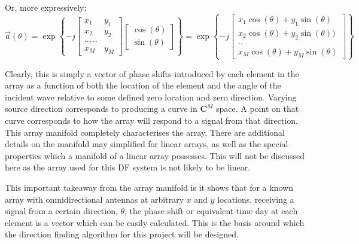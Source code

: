 Or, more expressively:
\begin{equation}
\vec{a}(\theta) = \exp \left\{ -j \begin{bmatrix} x_1 & y_1 \\ x_2 & y_2 \\ .., .. \\ x_M & y_M \end{bmatrix} \begin{bmatrix} \cos(\theta) \\ \sin(\theta) \end{bmatrix} \right\}
= \exp \left\{ -j \begin{bmatrix} x_1\cos(\theta) + y_1\sin(\theta) \\ x_2\cos(\theta) + y_2\sin(\theta)) \\ .. \\ x_M\cos(\theta) + y_M\sin(\theta) \end{bmatrix} \right\}
\end{equation}

Clearly, this is simply a vector of phase shifts introduced by each element in the array as a function of both the location of the element and the angle of the incident wave relative to some defined zero location and zero direction. 
Varying source direction corresponds to producing a curve in \(\mathbf{C}^M\) space. 
A point on that curve corresponds to how the array will respond to a signal from that direction.
This array manifold completely characterises the array\cite{dacos1995estimating}. 
There are additional details on the manifold may simplified for linear arrays, as well as the special properties which a manifold of a linear array possesses. 
This will not be discussed here as the array used for this DF system is not likely to be linear. 

This important takeaway from the array manifold is it shows that for a known array with omnidirectional antennas at arbitrary \(x\) and \(y\) locations, receiving a signal from a certain direction, \(\theta\), the phase shift or equivalent time day at each element is a vector which can be easily calculated. This is the basis around which the direction finding algorithm for this project will be designed. 

